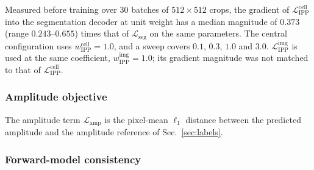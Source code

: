 \documentclass[11pt]{article}
\newcommand{\Lseg}{\mathcal{L}_\mathrm{seg}}
\newcommand{\Lippc}{\mathcal{L}_\mathrm{IPP}^\mathrm{cell}}
\newcommand{\Lippi}{\mathcal{L}_\mathrm{IPP}^\mathrm{img}}
\newcommand{\Lamp}{\mathcal{L}_\mathrm{amp}}
\begin{document}
Measured before training over 30 batches of $512\times512$ crops, the gradient
of $\Lippc$ into the segmentation decoder at unit weight has a median magnitude
of $0.373$ (range $0.243$--$0.655$) times that of $\Lseg$ on the same
parameters. The central configuration uses $w_\mathrm{IPP}^\mathrm{cell}=1.0$,
and a sweep covers $0.1$, $0.3$, $1.0$ and $3.0$. $\Lippi$ is used at the same
coefficient, $w_\mathrm{IPP}^\mathrm{img}=1.0$; its gradient magnitude was not
matched to that of $\Lippc$.

\subsubsection{Amplitude objective}
\label{sec:obj-amp}

The amplitude term $\Lamp$ is the pixel-mean $\ell_1$ distance between the
predicted amplitude and the amplitude reference of Sec.~\ref{sec:labels}.

\subsubsection{Forward-model consistency}
\label{sec:obj-fwd}
\end{document}
